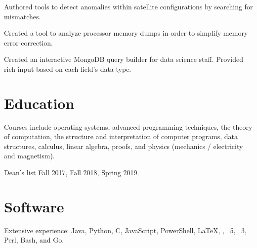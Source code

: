 \documentclass{article}
\begin{document}
\begin{job}[company=Iridium, dates=May--August 2018, title=Engineering Intern,
	city={Leesburg, \textsc{va}},
	supervisor=Ken Rock, supervisorcontact=\email{Ken.Rock@iridium.com}]

\item Authored tools to detect anomalies within satellite configurations by
searching for mismatches.

\item Created a tool to analyze processor memory dumps in order to simplify
memory error correction.

\item Created an interactive MongoDB query builder for data science staff.
Provided rich input based on each field's data type.

\end{job}

\section{Education}

\begin{education}

Courses include operating systems, advanced programming techniques, the
theory of computation, the structure and interpretation of computer
programs, data structures, calculus, linear algebra, proofs, and physics
(mechanics / electricity and magnetism).

Dean's list Fall 2017, Fall 2018, Spring 2019.

\end{education}

\section{Software}

Extensive experience: Java, Python, C, JavaScript, PowerShell, LaTeX,
\php, \html\ 5, \css\ 3, Perl, Bash, and Go.
\end{document}
